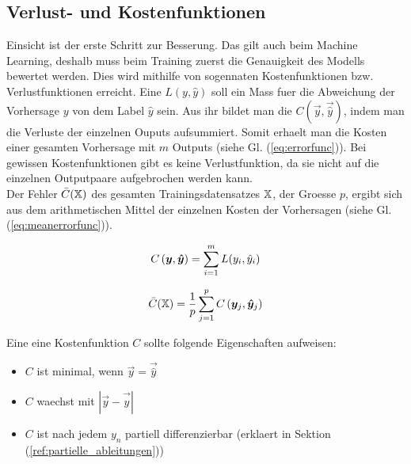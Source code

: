 \subsection{Verlust- und Kostenfunktionen}
Einsicht ist der erste Schritt zur Besserung. Das gilt auch beim Machine Learning, deshalb muss beim Training zuerst die Genauigkeit des Modells bewertet werden.
Dies wird mithilfe von sogennaten Kostenfunktionen bzw. Verlustfunktionen erreicht.
\para{}
Eine  $L(y,\hat{y})$ soll ein Mass fuer die
Abweichung der Vorhersage $y$ von dem Label $\hat{y}$ sein.
Aus ihr bildet man die  $C(\vec{y},\vec{\hat{y}})$, indem man die
Verluste der einzelnen Ouputs aufsummiert. Somit erhaelt man die Kosten
einer gesamten Vorhersage mit $m$ Outputs (siehe Gl. (\ref{eq:errorfunc})). Bei
gewissen Kostenfunktionen gibt es keine Verlustfunktion, da sie nicht auf die
einzelnen Outputpaare aufgebrochen werden kann. \\
Der Fehler $\bar{C}(\mathbb{X})$ des gesamten Trainingsdatensatzes $\mathbb{X}$, der
Groesse $p$, ergibt sich aus dem arithmetischen Mittel der einzelnen Kosten der
Vorhersagen (siehe Gl. (\ref{eq:meanerrorfunc})).
\\
\begin{minipage}[h!]{0.5\textwidth}
  \begin{equation}\label{eq:errorfunc}
    C \left(\bm{y},\bm{\hat{y}} \right) = \displaystyle\sum_{i=1}^{m} L(y_i, \hat{y}_i)
  \end{equation}
\end{minipage}
\begin{minipage}[h!]{0.5\textwidth}
  \begin{equation}\label{eq:meanerrorfunc}
    \bar{C}(\mathbb{X}) = \frac{1}{p}\displaystyle\sum_{j=1}^{p} C\left(\bm{y}_j,\bm{\hat{y}}_j\right)
  \end{equation}
\end{minipage}
\para{}
Eine eine Kostenfunktion $C$ sollte folgende Eigenschaften aufweisen:
\begin{itemize}
\item{$C$ ist minimal, wenn $\vec{y} = \vec{\hat{y}}$}
\item{$C$ waechst mit $|\vec{y} - \vec{\hat{y}}|$}
\item{$C$ ist nach jedem $y_n$ partiell differenzierbar (erklaert in Sektion (\ref{ref:partielle_ableitungen}))}
\end{itemize}
\para{}

